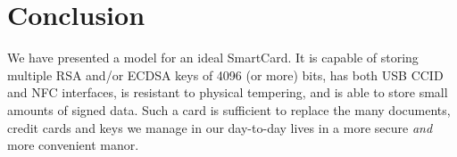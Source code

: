 \documentclass[11pt, twocolumn]{article}
\begin{document}
\section{Conclusion}
\label{sec:conclusion}

We have presented a model for an ideal SmartCard. It is capable of storing
multiple RSA and/or ECDSA keys of 4096 (or more) bits, has both USB CCID and
NFC interfaces, is resistant to physical tempering, and is able to store small
amounts of signed data. Such a card is sufficient to replace the many documents,
credit cards and keys we manage in our day-to-day lives in a more secure
\textit{and} more convenient manor.



\end{document}

